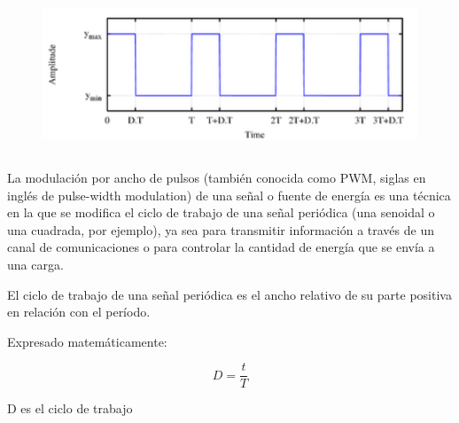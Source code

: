 \documentclass[12pt]{article}
\begin{document}

\begin{figure}[H]
	\begin{Center}
		\includegraphics[width=5.35in,height=1.88in]{./media/image2.png}
	\end{Center}
\end{figure}



\par

\begin{justify}
La modulación por ancho de pulsos (también conocida como PWM, siglas en inglés de pulse-width modulation) de una señal o fuente de energía es una técnica en la que se modifica el ciclo de trabajo de una señal periódica (una senoidal o una cuadrada, por ejemplo), ya sea para transmitir información a través de un canal de comunicaciones o para controlar la cantidad de energía que se envía a una carga.
\end{justify}\par

\begin{justify}
El ciclo de trabajo de una señal periódica es el ancho relativo de su parte positiva en relación con el período. 
\end{justify}\par

\begin{justify}
Expresado matemáticamente:
\end{justify}\par

\begin{justify}
 \[ D=\frac{t}{T} \] 
\end{justify}\par

\begin{Center}
D es el ciclo de trabajo
\end{Center}\par
\end{document}
